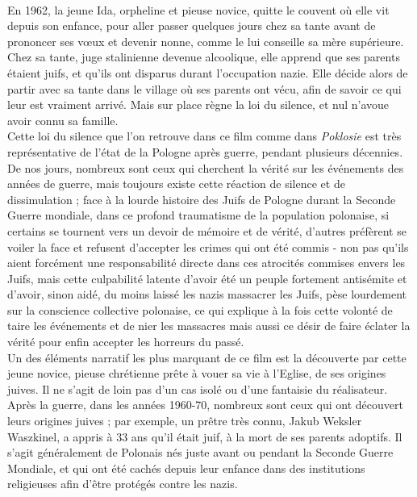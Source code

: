 \documentclass[12pt, twocolumn]{amsart}
\begin{document}
\paragraph{}
En 1962, la jeune Ida, orpheline et pieuse novice, quitte le couvent où elle vit depuis son enfance, pour aller passer quelques jours chez sa tante avant de prononcer ses vœux et devenir nonne, comme le lui conseille sa mère supérieure. Chez sa tante, juge stalinienne devenue alcoolique, elle apprend que ses parents étaient juifs, et qu'ils ont disparus durant l’occupation nazie. Elle décide alors de partir avec sa tante dans le village où ses parents ont vécu, afin de savoir ce qui leur est vraiment arrivé. Mais sur place règne la loi du silence, et nul n’avoue avoir connu sa famille. \\
Cette loi du silence que l'on retrouve dans ce film comme dans \emph{Poklosie} est très représentative de l'état de la Pologne après guerre, pendant plusieurs décennies. De nos jours, nombreux sont ceux qui cherchent la vérité sur les événements des années de guerre, mais toujours existe cette réaction de silence et de dissimulation ; face à la lourde histoire des Juifs de Pologne durant la Seconde Guerre mondiale, dans ce profond traumatisme de la population polonaise, si certains se tournent vers un devoir de mémoire et de vérité, d'autres préfèrent se voiler la face et refusent d'accepter les crimes qui ont été commis - non pas qu'ils aient forcément une responsabilité directe dans ces atrocités commises envers les Juifs, mais cette culpabilité latente d'avoir été un peuple fortement antisémite et d'avoir, sinon aidé, du moins laissé les nazis massacrer les Juifs, pèse lourdement sur la conscience collective polonaise, ce qui explique à la fois cette volonté de taire les événements et de nier les massacres mais aussi ce désir de faire éclater la vérité pour enfin accepter les horreurs du passé.\\
Un des éléments narratif les plus marquant de ce film est la découverte par cette jeune novice, pieuse chrétienne prête à vouer sa vie à l'Eglise, de ses origines juives. Il ne s'agit de loin pas d'un cas isolé ou d'une fantaisie du réalisateur. Après la guerre, dans les années 1960-70, nombreux sont ceux qui ont découvert leurs origines juives ; par exemple, un prêtre très connu, Jakub Weksler Waszkinel, a appris à 33 ans qu'il était juif, à la mort de ses parents adoptifs. Il s'agit généralement de Polonais nés juste avant ou pendant la Seconde Guerre Mondiale, et qui ont été cachés depuis leur enfance dans des institutions religieuses afin d'être protégés contre les nazis. \\
\end{document}
